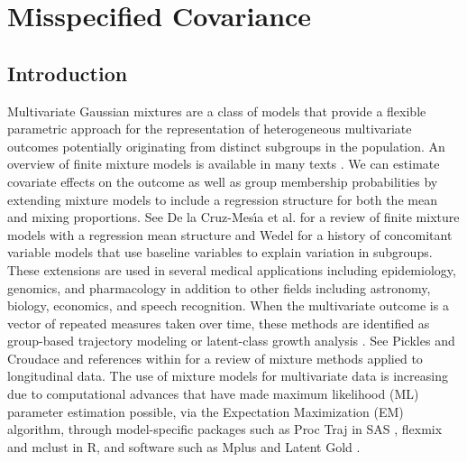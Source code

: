 \chapter{Misspecified Covariance}

 
  \section{Introduction}
\noindent Multivariate Gaussian mixtures are a class of models that provide a flexible parametric approach for the representation of heterogeneous multivariate outcomes potentially originating from distinct subgroups in the population. An overview of finite mixture models is available in many texts \cite{everitt1981,titterington1985,mclachlan1988,mclachlan2000,fruhwirth2006}. We can estimate covariate effects on the outcome as well as group membership probabilities by extending mixture models to include a regression structure for both the mean and mixing proportions. See De la Cruz-Mes\'{\i}a et al. \cite{cruzmesia2008} for a review of finite mixture models with a regression mean structure and Wedel \cite{wedel2002} for a history of concomitant variable models that use baseline variables to explain variation in subgroups. These extensions are used in several medical applications  \cite{pranab2011} including epidemiology, genomics, and pharmacology in addition to other fields including astronomy, biology, economics, and speech recognition. When the multivariate outcome is a vector of repeated measures taken over time, these methods are identified as group-based trajectory modeling \cite{nagin1999,nagin2005} or latent-class growth analysis \cite{muthen2000, muthen2001}. See Pickles and Croudace \cite{pickles2010} and references within for a review of mixture methods applied to longitudinal data. The use of mixture models for multivariate data is increasing due to computational advances that have made maximum likelihood (ML) parameter estimation possible, via the Expectation Maximization (EM) algorithm, through model-specific packages such as Proc Traj in SAS \cite{jones2001}, flexmix  \cite{leisch2004} and mclust \cite{fraley1999} in R, and software such as Mplus \cite{muthen2010} and Latent Gold \cite{vermunt2005}.\\


